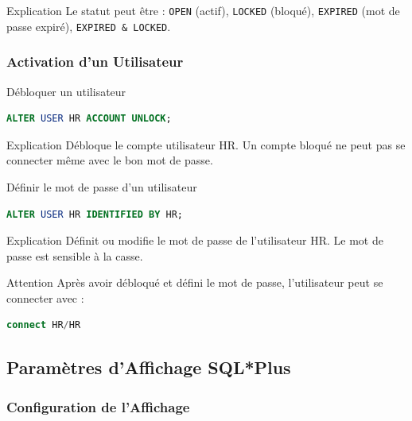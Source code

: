 \documentclass[12pt,a4paper]{article}
\begin{document}
\begin{explication}{Explication}
Le statut peut être : \texttt{OPEN} (actif), \texttt{LOCKED} (bloqué), \texttt{EXPIRED} (mot de passe expiré), \texttt{EXPIRED \& LOCKED}.
\end{explication}

\subsubsection{Activation d'un Utilisateur}

\begin{commande}{Débloquer un utilisateur}
\begin{lstlisting}[language=SQL]
ALTER USER HR ACCOUNT UNLOCK;
\end{lstlisting}
\end{commande}

\begin{explication}{Explication}
Débloque le compte utilisateur HR. Un compte bloqué ne peut pas se connecter même avec le bon mot de passe.
\end{explication}

\begin{commande}{Définir le mot de passe d'un utilisateur}
\begin{lstlisting}[language=SQL]
ALTER USER HR IDENTIFIED BY HR;
\end{lstlisting}
\end{commande}

\begin{explication}{Explication}
Définit ou modifie le mot de passe de l'utilisateur HR. Le mot de passe est sensible à la casse.
\end{explication}

\begin{attention}{Attention}
Après avoir débloqué et défini le mot de passe, l'utilisateur peut se connecter avec :
\begin{lstlisting}[language=SQL]
connect HR/HR
\end{lstlisting}
\end{attention}

\subsection{Paramètres d'Affichage SQL*Plus}

\subsubsection{Configuration de l'Affichage}
\end{document}
